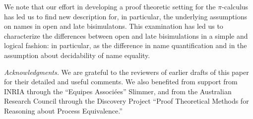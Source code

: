 \documentclass{acmtrans2m}
\begin{document}
We note that our effort in developing a proof theoretic setting for
the $\pi$-calculus has led us to find new description for, in
particular, the underlying assumptions on names in open and late
bisimulatons.  This examination has led us to characterize the
differences between open and late bisimulations in a simple and
logical fashion: in particular, as the difference in name
quantification and in the assumption about decidability of name
equality.

\smallskip
\noindent
{\em Acknowledgments.}  We are grateful to the reviewers of earlier
drafts of this paper for their detailed and useful comments.  We also
benefited from support from INRIA through the ``Equipes
Associ{\'e}es'' Slimmer, and from the Australian Research Council
through the Discovery Project ``Proof Theoretical Methods for 
Reasoning about Process Equivalence.''
\par 
\end{document}
